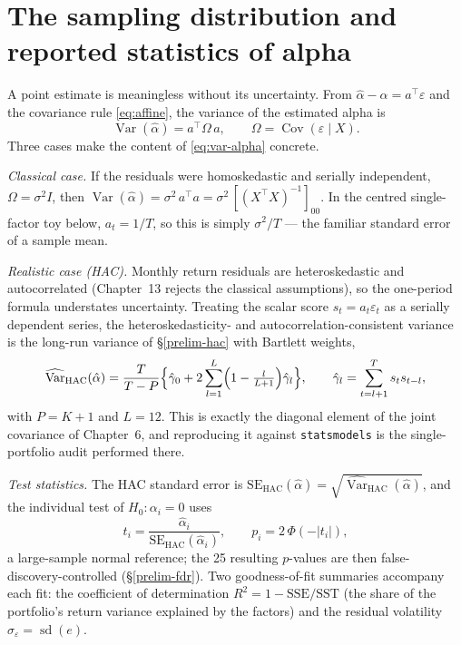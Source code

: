 \section{The sampling distribution and reported statistics of alpha}\label{alpha-sampling}

A point estimate is meaningless without its uncertainty. From
$\hat\alpha-\alpha=a^{\top}\varepsilon$ and the covariance rule
\eqref{eq:affine}, the variance of the estimated alpha is
\begin{equation}\label{eq:var-alpha}
\operatorname{Var}(\hat\alpha) = a^{\top}\Omega\,a,
\qquad \Omega=\operatorname{Cov}(\varepsilon\mid X).
\end{equation}
Three cases make the content of \eqref{eq:var-alpha} concrete.

\emph{Classical case.} If the residuals were homoskedastic and serially
independent, $\Omega=\sigma^2 I$, then
$\operatorname{Var}(\hat\alpha)=\sigma^2\,a^{\top}a=\sigma^2\,[(X^{\top}X)^{-1}]_{00}$.
In the centred single-factor toy below, $a_t=1/T$, so this is simply
$\sigma^2/T$ --- the familiar standard error of a sample mean.

\emph{Realistic case (HAC).} Monthly return residuals are heteroskedastic
and autocorrelated (Chapter~13 rejects the classical assumptions), so the
one-period formula understates uncertainty. Treating the scalar score
$s_t=a_t\varepsilon_t$ as a serially dependent series, the
heteroskedasticity- and autocorrelation-consistent variance is the
long-run variance of \S\ref{prelim-hac} with Bartlett weights,
\begin{equation}\label{eq:hac-alpha}
\widehat{\operatorname{Var}}_{\mathrm{HAC}}(\hat\alpha)
=\frac{T}{T-P}\Bigl\{\hat\gamma_0+2\sum_{l=1}^{L}\Bigl(1-\tfrac{l}{L+1}\Bigr)\hat\gamma_l\Bigr\},
\qquad \hat\gamma_l=\sum_{t=l+1}^{T} s_t s_{t-l},
\end{equation}
with $P=K+1$ and $L=12$. This is exactly the diagonal element of the joint
covariance of Chapter~6, and reproducing it against \texttt{statsmodels}
is the single-portfolio audit performed there.

\emph{Test statistics.} The HAC standard error is
$\mathrm{SE}_{\mathrm{HAC}}(\hat\alpha)=\sqrt{\widehat{\operatorname{Var}}_{\mathrm{HAC}}(\hat\alpha)}$,
and the individual test of $H_0:\alpha_i=0$ uses
\begin{equation}\label{eq:alpha-tstat}
t_i=\frac{\hat\alpha_i}{\mathrm{SE}_{\mathrm{HAC}}(\hat\alpha_i)},
\qquad p_i = 2\,\Phi(-\lvert t_i\rvert),
\end{equation}
a large-sample normal reference; the 25 resulting $p$-values are then
false-discovery-controlled (\S\ref{prelim-fdr}). Two goodness-of-fit
summaries accompany each fit: the coefficient of determination
$R^2=1-\mathrm{SSE}/\mathrm{SST}$ (the share of the portfolio's return
variance explained by the factors) and the residual volatility
$\hat\sigma_\varepsilon=\operatorname{sd}(e)$.

